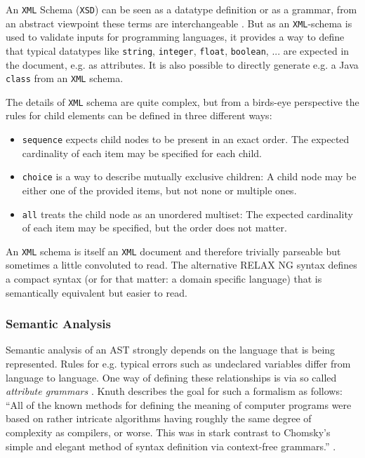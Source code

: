 An \texttt{XML} Schema (\texttt{XSD}) \cite{xml_schema} can be seen as a datatype definition or as a grammar, from an abstract viewpoint these terms are interchangeable \cite[Chapter 5.3.4 \enquote{XML and Document Type Definitions}]{hopcroft_formal_languages}. But as an \texttt{XML}-schema is used to validate inputs for programming languages, it provides a way to define that typical datatypes like \texttt{string}, \texttt{integer}, \texttt{float}, \texttt{boolean}, ... are expected in the document, e.g. as attributes. It is also possible to directly generate e.g. a Java \texttt{class} from an \texttt{XML} schema.

The details of \texttt{XML} schema are quite complex, but from a birds-eye perspective the rules for child elements can be defined in three different ways:

\begin{itemize}
\item \texttt{sequence} expects child nodes to be present in an exact order. The expected cardinality of each item may be specified for each child.
\item \texttt{choice} is a way to describe mutually exclusive children: A child node may be either one of the provided items, but not none or multiple ones.
\item \texttt{all} treats the child node as an unordered multiset: The expected cardinality of each item may be specified, but the order does not matter.
\end{itemize}

An \texttt{XML} schema is itself an \texttt{XML} document and therefore trivially parseable but sometimes a little convoluted to read. The alternative RELAX NG syntax defines a compact syntax (or for that matter: a domain specific language) that is semantically equivalent but easier to read.

\subsubsection{Semantic Analysis}

Semantic analysis of an AST strongly depends on the language that is being represented. Rules for e.g. typical errors such as undeclared variables differ from language to language. One way of defining these relationships is via so called \textit{attribute grammars} \cite{knuth_semantics_1968}. Knuth describes the goal for such a formalism as follows: \enquote{All of the known methods for defining the meaning of computer programs were
based on rather intricate algorithms having roughly the same degree of complexity as
compilers, or worse. This was in stark contrast to Chomsky’s simple and elegant method
of syntax definition via context-free grammars.} \cite{knuth_genesis_1990}.

